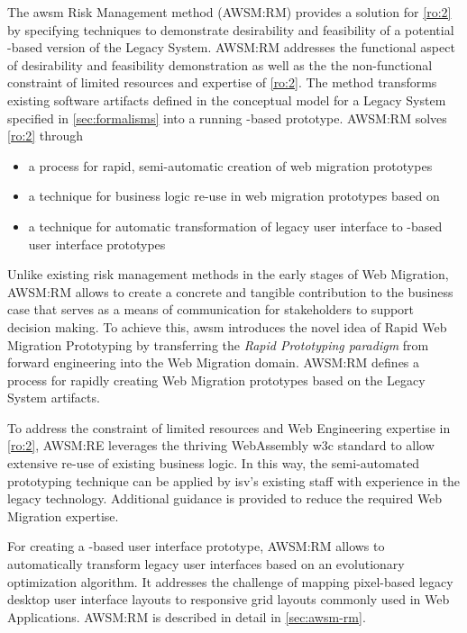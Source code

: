 The \gls{awsm} Risk Management method (AWSM:RM) provides a solution for \cref{ro:2} by specifying techniques to demonstrate desirability and feasibility of a potential -based version of the \gls{Legacy System}.
AWSM:RM addresses the functional aspect of desirability and feasibility demonstration as well as the the non-functional constraint of limited resources and expertise of \cref{ro:2}.
The method transforms existing software \glspl{artifact} defined in the conceptual model for a \gls{Legacy System} specified in \cref{sec:formalisms} into a running -based prototype.
AWSM:RM solves \cref{ro:2} through
\begin{itemize}
\item a process for rapid, semi-automatic creation of \glspl{web migration prototype}
\item a technique for business logic re-use in \glspl{web migration prototype} based on 
\item a technique for automatic transformation of legacy user interface to -based user interface prototypes
\end{itemize}

\par\smallskip
Unlike existing \gls{risk management} methods in the early stages of \gls{Web Migration}, AWSM:RM allows to create a concrete and tangible contribution to the \gls{business case} that serves as a means of communication for stakeholders to support decision making.
To achieve this, \gls{awsm} introduces the novel idea of \gls{Rapid Web Migration Prototyping} \autocite{Heil2018ReWaMP} by transferring the \emph{\gls{Rapid Prototyping} paradigm} \autocite{Gordon1995RapidPrototyping} from forward engineering into the \gls{Web Migration} domain.
AWSM:RM defines a process for rapidly creating \gls{Web Migration} prototypes based on the \gls{Legacy System} \glspl{artifact}.

To address the constraint of limited resources and \gls{Web Engineering} expertise in \cref{ro:2}, AWSM:RE leverages the thriving WebAssembly \gls{w3c} standard \autocite{W3C2018WebAssembly} to allow extensive re-use of existing business logic.
In this way, the semi-automated prototyping technique can be applied by  \gls{isv}'s existing staff with experience in the legacy technology.
Additional guidance is provided to reduce the required \gls{Web Migration} expertise.

For creating a -based user interface prototype, AWSM:RM allows to automatically transform legacy user interfaces based on an evolutionary optimization algorithm.
It addresses the challenge of mapping pixel-based legacy desktop user interface layouts to responsive grid layouts commonly used in \glspl{Web Application}.
AWSM:RM is described in detail in \cref{sec:awsm-rm}.

